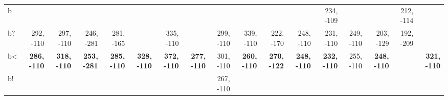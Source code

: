 \begin{table}[p]
{\begin{tabular}{lrrrrrrrrrrrrrrrr}
b &  &  &  &  &  &  &  &  &  &  &  & 234, -109 &  &  & 212, -114 &  \\
b? & 292, -110 & 297, -110 & 246, -281 & 281, -165 &  & 335, -110 &  & 299, -110 & 339, -110 & 222, -170 & 248, -110 & 231, -110 & 249, -110 & 203, -129 & 192, -209 &  \\
b< & \textbf{286, -110} & \textbf{318, -110} & \textbf{253, -281} & \textbf{285, -110} & \textbf{328, -110} & \textbf{372, -110} & \textbf{277, -110} & 301, -110 & \textbf{260, -110} & \textbf{270, -122} & \textbf{248, -110} & \textbf{232, -110} & 255, -110 & \textbf{248, -110} &  & \textbf{321, -110} \\
b! &  &  &  &  &  &  &  & 267, -110 &  &  &  &  &  &  &  &  \\

\end{tabular}
}
\end{table}
\clearpage



